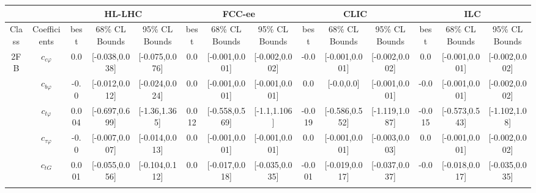 \documentclass{article}
\begin{document}
\begin{table}[H]
\centering
\begin{tabular}{|c|c|c|c|c|c|c|c|c|c|c|c|c|c|}
\hline
 &  & \multicolumn{3}{c|}{HL-LHC} & \multicolumn{3}{c|}{FCC-ee} & \multicolumn{3}{c|}{CLIC} & \multicolumn{3}{c|}{ILC} \\ \hline
Class & Coefficients & best & 68\% CL Bounds & 95\% CL Bounds & best & 68\% CL Bounds & 95\% CL Bounds & best & 68\% CL Bounds & 95\% CL Bounds & best & 68\% CL Bounds & 95\% CL Bounds\\ \hline
\multirow{23}{*}{2FB}
 & $c_{c \varphi}$ & 0.0                             & [-0.038,0.038]                                 & [-0.075,0.076] & 0.0                             & [-0.001,0.001]                                 & [-0.002,0.002] & -0.0                             & [-0.001,0.001]                                 & [-0.002,0.002] & 0.0                             & [-0.001,0.001]                                 & [-0.002,0.002] \\ \cline{2-14}
 & $c_{b \varphi}$ & -0.0                             & [-0.012,0.012]                                 & [-0.024,0.024] & 0.0                             & [-0.001,0.001]                                 & [-0.001,0.001] & 0.0                             & [-0.0,0.0]                                 & [-0.001,0.001] & -0.0                             & [-0.001,0.001]                                 & [-0.002,0.002] \\ \cline{2-14}
 & $c_{t \varphi}$ & 0.004                             & [-0.697,0.699]                                 & [-1.36,1.365] & 0.012                             & [-0.558,0.569]                                 & [-1.1,1.106] & -0.019                             & [-0.586,0.552]                                 & [-1.119,1.087] & -0.015                             & [-0.573,0.543]                                 & [-1.102,1.08] \\ \cline{2-14}
 & $c_{\tau \varphi}$ & -0.0                             & [-0.007,0.007]                                 & [-0.014,0.013] & 0.0                             & [-0.001,0.001]                                 & [-0.001,0.001] & 0.0                             & [-0.001,0.001]                                 & [-0.003,0.003] & 0.0                             & [-0.001,0.001]                                 & [-0.002,0.002] \\ \cline{2-14}
 & $c_{tG}$ & 0.001                             & [-0.055,0.056]                                 & [-0.104,0.112] & 0.0                             & [-0.017,0.018]                                 & [-0.035,0.035] & -0.001                             & [-0.019,0.017]                                 & [-0.037,0.037] & -0.0                             & [-0.018,0.017]                                 & [-0.035,0.035] \\ \cline{2-14}

\end{tabular}
\end{table}
\end{document}
